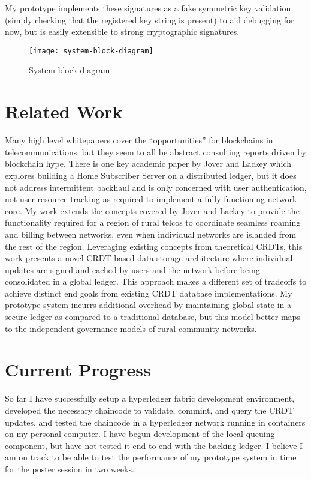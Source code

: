 My prototype implements these signatures as a fake symmetric key
validation (simply checking that the registered key string is present)
to aid debugging for now, but is easily extensible to strong
cryptographic signatures.

\begin{figure*}[t]
  \texttt{[image: system-block-diagram]}
  \caption{System block diagram}
\end{figure*}

\section{Related Work}
Many high level whitepapers cover the ``opportunities'' for
blockchains in
telecommunications\cite{BabuBlockchainTelco2016}\cite{BubleyBlockchainTelecomsIndustry2017}\cite{BaeOperatingmiddledigital},
but they seem to all be abstract consulting reports driven by
blockchain hype. There is one key academic paper by Jover and
Lackey\cite{JoverdHSSdistributedPeertoPeer2016a} which explores
building a Home Subscriber Server on a distributed ledger, but it does
not address intermittent backhaul and is only concerned with user
authentication, not user resource tracking as required to implement a
fully functioning network core. My work extends the concepts covered
by Jover and Lackey to provide the functionality required for a region
of rural telcos to coordinate seamless roaming and billing between
networks, even when individual networks are islanded from the rest of
the region. Leveraging existing concepts from theoretical
CRDTs\cite{ShapiroConflictfreereplicateddata2011}, this work presents
a novel CRDT based data storage architecture where individual updates
are signed and cached by users and the network before being
consolidated in a global ledger. This approach makes a different set
of tradeoffs to achieve distinct end goals from existing CRDT database
implementations.\cite{DatanetNewCRDT16} My prototype system incurrs
additional overhead by maintaining global state in a secure ledger as
compared to a traditional database, but this model better maps to the
independent governance models of rural community networks.

\section{Current Progress}

So far I have successfully setup a hyperledger fabric development
environment, developed the necessary chaincode to validate, commint,
and query the CRDT updates, and tested the chaincode in a hyperledger
network running in containers on my personal computer. I have begun
development of the local queuing component, but have not tested it end
to end with the backing ledger. I believe I am on track to be able to
test the performance of my prototype system in time for the poster
session in two weeks.

